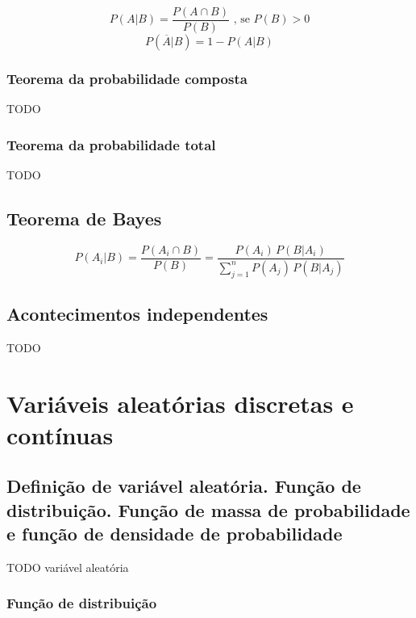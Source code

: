 \documentclass[11pt, a4paper]{article}
\begin{document}
\begin{equation*}
    P(A|B) = \frac{P(A \cap B)}{P(B)} \text{ , se } P(B) > 0
\end{equation*}
\begin{equation*}
    P(\overline{A}|B) = 1 - P(A|B)
\end{equation*}

\subsubsection*{Teorema da probabilidade composta}

TODO

\subsubsection*{Teorema da probabilidade total}

TODO

\subsection{Teorema de Bayes}

\begin{equation*}
    P(A_i|B) = \frac{P(A_i \cap B)}{P(B)}
    = \frac{P(A_i) \, P(B|A_i)}{\sum_{j=1}^{n}P(A_j) \, P(B|A_j)}
\end{equation*}

\subsection{Acontecimentos independentes}

TODO

\newpage
\section{Variáveis aleatórias discretas e contínuas}

\subsection{Definição de variável aleatória. Função de distribuição. Função de massa de probabilidade e função de densidade de probabilidade}

TODO variável aleatória

\subsubsection*{Função de distribuição}
\end{document}
